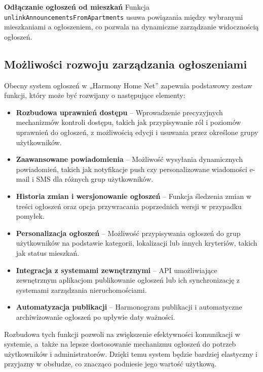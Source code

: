 \noindent \textbf{Odłączanie ogłoszeń od mieszkań}\newline
Funkcja \texttt{unlinkAnnouncementsFromApartments} usuwa powiązania między wybranymi mieszkaniami a ogłoszeniem, co pozwala na dynamiczne zarządzanie widocznością ogłoszeń.

\subsection{Możliwości rozwoju zarządzania ogłoszeniami}
Obecny system ogłoszeń w „Harmony Home Net” zapewnia podstawowy zestaw funkcji, który może być rozwijany o następujące elementy:
\begin{itemize}
    \item \textbf{Rozbudowa uprawnień dostępu} -- Wprowadzenie precyzyjnych mechanizmów kontroli dostępu, takich jak przypisywanie ról i poziomów uprawnień do ogłoszeń, z możliwością edycji i usuwania przez określone grupy użytkowników.
    
    \item \textbf{Zaawansowane powiadomienia}  -- Możliwość wysyłania dynamicznych powiadomień, takich jak notyfikacje push czy personalizowane wiadomości e-mail i SMS dla różnych grup użytkowników.

    \item \textbf{Historia zmian i wersjonowanie ogłoszeń} -- Funkcja śledzenia zmian w treści ogłoszeń oraz opcja przywracania poprzednich wersji w przypadku pomyłek.

    \item \textbf{Personalizacja ogłoszeń} -- Możliwość przypisywania ogłoszeń do grup użytkowników na podstawie kategorii, lokalizacji lub innych kryteriów, takich jak status mieszkań.

    \item \textbf{Integracja z systemami zewnętrznymi} -- API umożliwiające zewnętrznym aplikacjom publikowanie ogłoszeń lub ich synchronizację z systemami zarządzania nieruchomościami.

    \item \textbf{Automatyzacja publikacji} -- Harmonogram publikacji i automatyczne archiwizowanie ogłoszeń po upływie daty ważności.
\end{itemize}

Rozbudowa tych funkcji pozwoli na zwiększenie efektywności komunikacji w systemie, a~także na lepsze dostosowanie mechanizmu ogłoszeń do potrzeb użytkowników i administratorów. Dzięki temu system będzie bardziej elastyczny i przyjazny w obsłudze, co znacząco podniesie jego wartość użytkową.




